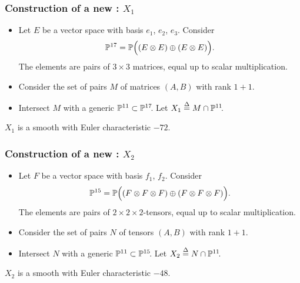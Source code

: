 \begin{frame}
    \frametitle{Construction of a new \CY: $X_1$}

\pause

    \begin{itemize}
	    \item
        Let $E$ be a vector space with basis $e_1$, $e_2$, $e_3$. Consider
        \[
            \P^{17} = \P\Big((E \otimes E) \oplus (E \otimes E) \Big).
        \]
        The elements are pairs of $3 \times 3$ matrices, equal up to scalar multiplication.
        \pause

        \item
        Consider the set of pairs $M$ of matrices $(A, B)$ with rank $1 + 1$.
        \pause

        \item
        Intersect $M$ with a generic $\P^{11} \subset \P^{17}\mkern-4mu$. Let $X_1 \defeq M \cap \P^{11}\mkern-4mu$.
        \pause
    \end{itemize}

    \begin{theorem}
        $X_1$ is a smooth \CY with Euler characteristic $-72$.
    \end{theorem}
\end{frame}


\begin{frame}
    \frametitle{Construction of a new \CY: $X_2$}

    \begin{itemize}
    	\item Let $F$ be a vector space with basis $f_1$, $f_2$. Consider
	    \[
            \P^{15} = \P\Big((F \otimes F \otimes F) \oplus (F \otimes F \otimes F)\Big).
	    \]
	    The elements are pairs of $2 \times 2 \times 2$-tensors, equal up to scalar multiplication.

	    \item
	    Consider the set of pairs $N$ of tensors $(A, B)$ with rank $1 + 1$.

	    \item
	    Intersect $N$ with a generic $\P^{11} \subset \P^{15}\mkern-4mu$. Let $X_2 \defeq N \cap \P^{11}\mkern-4mu$.
    \end{itemize}

    \begin{theorem}
        $X_2$ is a smooth \CY with Euler characteristic $-48$.
    \end{theorem}
\end{frame}

